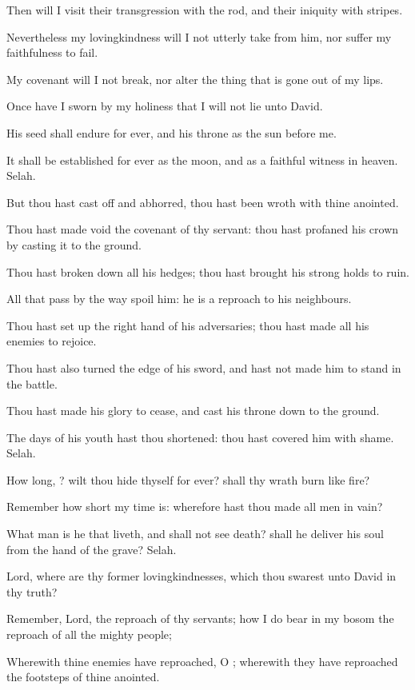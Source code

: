 \Verse Then will I visit their transgression with the rod, and their iniquity with stripes.

\Verse Nevertheless my lovingkindness will I not utterly take from him, nor suffer my faithfulness to fail.

\Verse My covenant will I not break, nor alter the thing that is gone out of my lips.

\Verse Once have I sworn by my holiness that I will not lie unto David.

\Verse His seed shall endure for ever, and his throne as the sun before me.

\Verse It shall be established for ever as the moon, and as a faithful witness in heaven. Selah.

\Verse But thou hast cast off and abhorred, thou hast been wroth with thine anointed.

\Verse Thou hast made void the covenant of thy servant: thou hast profaned his crown by casting it to the ground.

\Verse Thou hast broken down all his hedges; thou hast brought his strong holds to ruin.

\Verse All that pass by the way spoil him: he is a reproach to his neighbours.

\Verse Thou hast set up the right hand of his adversaries; thou hast made all his enemies to rejoice.

\Verse Thou hast also turned the edge of his sword, and hast not made him to stand in the battle.

\Verse Thou hast made his glory to cease, and cast his throne down to the ground.

\Verse The days of his youth hast thou shortened: thou hast covered him with shame. Selah.

\Verse How long, \LORD? wilt thou hide thyself for ever? shall thy wrath burn like fire?

\Verse Remember how short my time is: wherefore hast thou made all men in vain?

\Verse What man is he that liveth, and shall not see death? shall he deliver his soul from the hand of the grave? Selah.

\Verse Lord, where are thy former lovingkindnesses, which thou swarest unto David in thy truth?

\Verse Remember, Lord, the reproach of thy servants; how I do bear in my bosom the reproach of all the mighty people;

\Verse Wherewith thine enemies have reproached, O \LORD; wherewith they have reproached the footsteps of thine anointed.

